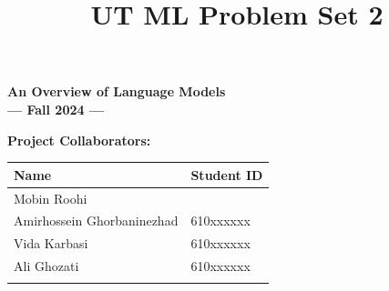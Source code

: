 \documentclass[11pt,twoside]{article}
\title{UT ML Problem Set 2}
\begin{document}

\setlength{\parindent}{0pt}

\begin{center}

{\LARGE \textbf{An Overview of Language Models }} \\[20pt]

\textbf{ --- Fall 2024 --- } \\[15pt]

\medskip

{\large \textbf{Project Collaborators:}}
\medskip

\begin{table}[h]
\centering
\begin{tabularx}{0.8\textwidth}{>{\centering\arraybackslash}X >{\centering\arraybackslash}X}
\toprule
\textbf{Name} & \textbf{Student ID} \\
\midrule
Mobin Roohi & 610300060 \\
Amirhossein Ghorbaninezhad &  610xxxxxx\\
Vida Karbasi & 610xxxxxx \\
Ali Ghozati & 610xxxxxx \\
\bottomrule \\[20pt]
\end{tabularx}
\end{table}
\end{center}


\begin{abstract}
\textit{}

\textit{
}

\textit{
}

\textit{
}
\end{abstract}

\newpage




\end{document}
